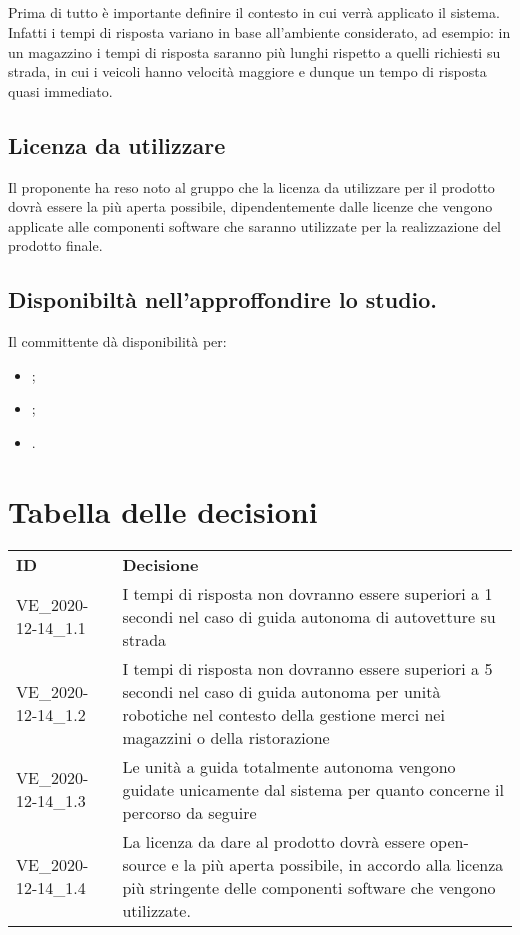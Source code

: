 \documentclass[]{article}
\begin{document}
		\subsection{}
		Prima di tutto è importante definire il contesto in cui verrà applicato il sistema.\\
		Infatti i tempi di risposta variano in base all'ambiente considerato, ad esempio: in un magazzino i tempi di risposta saranno più lunghi
		rispetto a quelli richiesti su strada, in cui i veicoli hanno velocità maggiore e dunque un tempo di risposta quasi immediato.

		\subsection{Licenza da utilizzare}
		Il proponente ha reso noto al gruppo che la licenza  da utilizzare per il prodotto dovrà essere la più aperta possibile, dipendentemente dalle licenze che vengono applicate alle componenti software che saranno utilizzate per la realizzazione del prodotto finale.

		\subsection{Disponibiltà nell'approffondire lo studio.}
		Il committente dà disponibilità per:
		\begin{itemize}
			\item {};
			\item {};
			\item {}.
		\end{itemize}

		\section{Tabella delle decisioni}

		\begin{table} [h!]
			\begin{center}
				\begin{tabular} { m{2cm} m{14cm} }
					\rowcolor{lightgray}
					\textbf{ID} & \textbf{Decisione}\\
					VE_2020-12-14_1.1 & I tempi di risposta non dovranno essere superiori a 1 secondi nel caso di guida autonoma di autovetture su strada \\
					VE_2020-12-14_1.2 & I tempi di risposta non dovranno essere superiori a 5 secondi nel caso di guida autonoma per unità robotiche nel contesto della gestione merci nei magazzini o della ristorazione \\
					VE_2020-12-14_1.3 & Le unità a guida totalmente autonoma vengono guidate unicamente dal sistema per quanto concerne il percorso da seguire \\
					VE_2020-12-14_1.4 & La licenza da dare al prodotto dovrà essere open-source e la più aperta possibile, in accordo alla licenza più stringente delle componenti software che vengono utilizzate.
				\end{tabular}
			\end{center}
		\end{table}
\end{document}
